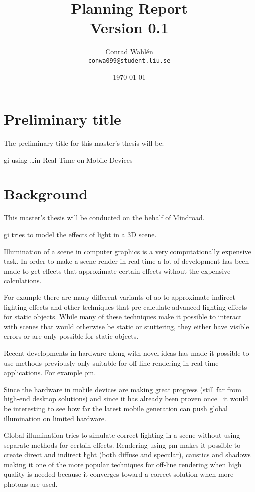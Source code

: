 \documentclass[a4paper, 12pt]{article}
\title{Planning Report \\ \small{Version 0.1}}
\author{Conrad Wahlén \\ \texttt{conwa099@student.liu.se}}
\date{\today}
\begin{document}
\maketitle
\thispagestyle{empty}
\newpage


\section{Preliminary title}
\label{sec:Preliminary title}

The preliminary title for this master's thesis will be:

\acrlong{gi} using \ldots in Real-Time on Mobile Devices

\section{Background}
\label{sec:Background}

This master's thesis will be conducted on the behalf of Mindroad.

\gls{gi} tries to model the effects of light in a 3D scene.

Illumination of a scene in computer graphics is a very computationally expensive task. In order to make a scene render in real-time a lot of development has been made to get effects that approximate certain effects without the expensive calculations.

For example there are many different variants of \gls{ao} to approximate indirect lighting effects and other techniques that pre-calculate advanced lighting effects for static objects. While many of these techniques make it possible to interact with scenes that would otherwise be static or stuttering, they either have visible errors or are only possible for static objects.

Recent developments in hardware along with novel ideas has made it possible to use methods previously only suitable for off-line rendering in real-time applications. For example \gls{pm}.

Since the hardware in mobile devices are making great progress (still far from high-end desktop solutions) and since it has already been proven once~\cite{gimobile} it would be interesting to see how far the latest mobile generation can push global illumination on limited hardware.

Global illumination tries to simulate correct lighting in a scene without using separate methods for certain effects. Rendering using \gls{pm} makes it possible to create direct and indirect light (both diffuse and specular), caustics and shadows making it one of the more popular techniques for off-line rendering when high quality is needed because it converges toward a correct solution when more photons are used.
\end{document}
